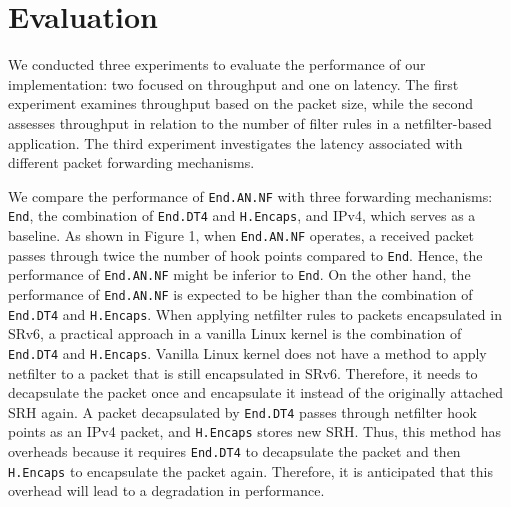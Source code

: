 \chapter{Evaluation}
\label{chap:evaluation}
We conducted three experiments to evaluate the performance of our implementation: two focused on throughput and one on latency.
The first experiment examines throughput based on the packet size, while the second assesses throughput in relation to the number of filter rules in a netfilter-based application.
The third experiment investigates the latency associated with different packet forwarding mechanisms.


We compare the performance of \texttt{End.AN.NF} with three forwarding mechanisms: \texttt{End}, the combination of \texttt{End.DT4} and \texttt{H.Encaps}, and IPv4, which serves as a baseline.
As shown in Figure 1, when \texttt{End.AN.NF} operates, a received packet passes through twice the number of hook points compared to \texttt{End}.
Hence, the performance of \texttt{End.AN.NF} might be inferior to \texttt{End}.
On the other hand, the performance of \texttt{End.AN.NF} is expected to be higher than the combination of \texttt{End.DT4} and \texttt{H.Encaps}.
When applying netfilter rules to packets encapsulated in SRv6, a practical approach in a vanilla Linux kernel is the combination of \texttt{End.DT4} and \texttt{H.Encaps}.
Vanilla Linux kernel does not have a method to apply netfilter to a packet that is still encapsulated in SRv6.
Therefore, it needs to decapsulate the packet once and encapsulate it instead of the originally attached SRH again.
A packet decapsulated by \texttt{End.DT4} passes through netfilter hook points as an IPv4 packet, and \texttt{H.Encaps} stores new SRH.
Thus, this method has overheads because it requires \texttt{End.DT4} to decapsulate the packet and then \texttt{H.Encaps} to encapsulate the packet again.
Therefore, it is anticipated that this overhead will lead to a degradation in performance.


%

